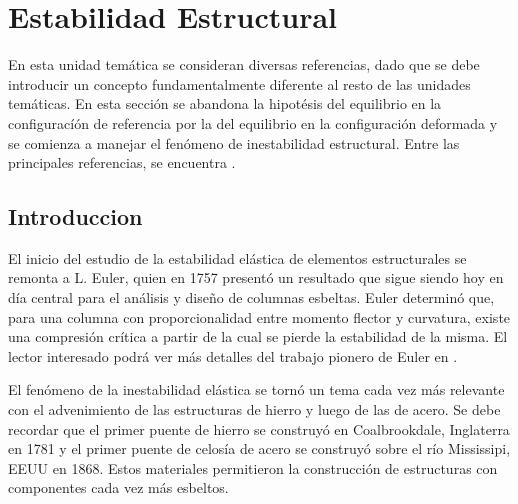 %
%
%

\chapter{Estabilidad Estructural}

En esta unidad temática se consideran diversas referencias, dado que se debe introducir un concepto fundamentalmente diferente al resto de las unidades temáticas. En esta sección se abandona la hipotésis del equilibrio en la configuracíón de referencia por la del equilibrio en la configuración deformada y se comienza a manejar el fenómeno de inestabilidad estructural. %
%
Entre las principales referencias, se encuentra \citep{yoo2011}.

\section{Introduccion} 

El inicio del estudio de la estabilidad elástica de elementos estructurales se remonta a L. Euler, quien en 1757 presentó un resultado que sigue siendo hoy en día central para el análisis y diseño de columnas esbeltas. Euler determinó que, para una columna con proporcionalidad entre momento flector y curvatura, existe una compresión crítica a partir de la cual se pierde la estabilidad de la misma. El lector interesado podrá ver más detalles del trabajo pionero de Euler en \citep{Timoshenko1953}.

El fenómeno de la inestabilidad elástica se tornó un tema cada vez más relevante con el advenimiento de las estructuras de hierro y luego de las de acero. Se debe recordar que el primer puente de hierro se construyó en Coalbrookdale, Inglaterra en 1781 y el primer puente de celosía de acero se construyó sobre el río Mississipi, EEUU en 1868.  Estos materiales permitieron la construcción de estructuras con componentes cada vez más esbeltos. 

